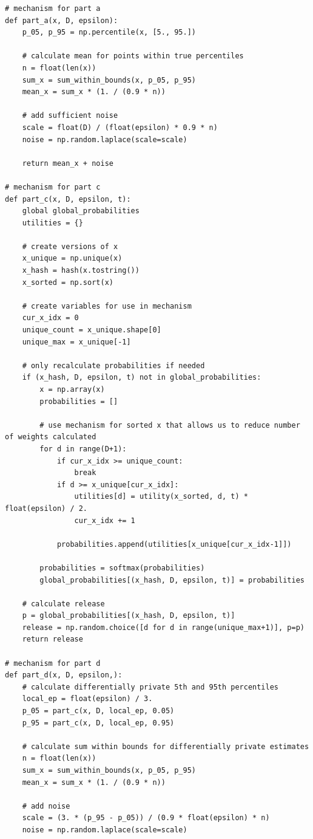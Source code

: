 \documentclass[12pt]{article}
\begin{document}
\begin{appendices}
\begin{lstlisting}
# mechanism for part a
def part_a(x, D, epsilon):
    p_05, p_95 = np.percentile(x, [5., 95.])

    # calculate mean for points within true percentiles
    n = float(len(x))
    sum_x = sum_within_bounds(x, p_05, p_95)
    mean_x = sum_x * (1. / (0.9 * n))

    # add sufficient noise
    scale = float(D) / (float(epsilon) * 0.9 * n)
    noise = np.random.laplace(scale=scale)

    return mean_x + noise

# mechanism for part c
def part_c(x, D, epsilon, t):
    global global_probabilities
    utilities = {}

    # create versions of x
    x_unique = np.unique(x)
    x_hash = hash(x.tostring())
    x_sorted = np.sort(x)

    # create variables for use in mechanism
    cur_x_idx = 0
    unique_count = x_unique.shape[0]
    unique_max = x_unique[-1]

    # only recalculate probabilities if needed
    if (x_hash, D, epsilon, t) not in global_probabilities:
        x = np.array(x)
        probabilities = []

        # use mechanism for sorted x that allows us to reduce number of weights calculated
        for d in range(D+1):
            if cur_x_idx >= unique_count:
                break
            if d >= x_unique[cur_x_idx]:
                utilities[d] = utility(x_sorted, d, t) * float(epsilon) / 2.
                cur_x_idx += 1

            probabilities.append(utilities[x_unique[cur_x_idx-1]])

        probabilities = softmax(probabilities)
        global_probabilities[(x_hash, D, epsilon, t)] = probabilities

    # calculate release
    p = global_probabilities[(x_hash, D, epsilon, t)]
    release = np.random.choice([d for d in range(unique_max+1)], p=p)
    return release

# mechanism for part d
def part_d(x, D, epsilon,):
    # calculate differentially private 5th and 95th percentiles
    local_ep = float(epsilon) / 3.
    p_05 = part_c(x, D, local_ep, 0.05)
    p_95 = part_c(x, D, local_ep, 0.95)

    # calculate sum within bounds for differentially private estimates
    n = float(len(x))
    sum_x = sum_within_bounds(x, p_05, p_95)
    mean_x = sum_x * (1. / (0.9 * n))

    # add noise
    scale = (3. * (p_95 - p_05)) / (0.9 * float(epsilon) * n)
    noise = np.random.laplace(scale=scale)


\end{lstlisting}
\end{appendices}
\end{document}
